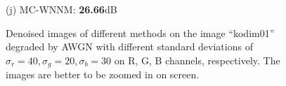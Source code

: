 \documentclass[10pt,onecolumn,letterpaper]{article}
\begin{document}
\begin{figure}[!htbp]
{\begin{minipage}[t]{0.24\textwidth}
{\footnotesize (j) MC-WNNM: \textbf{26.66}dB}
\end{minipage}
}
\caption{Denoised images of different methods on the image ``kodim01'' degraded by AWGN with different standard deviations of $\sigma_{r}=40, \sigma_{g}=20, \sigma_{b}=30$ on R, G, B channels, respectively. The images are better to be zoomed in on screen.}
\label{f1}
\end{figure}


\begin{figure}[!htbp]
\centering
{}
\end{figure}
\end{document}
